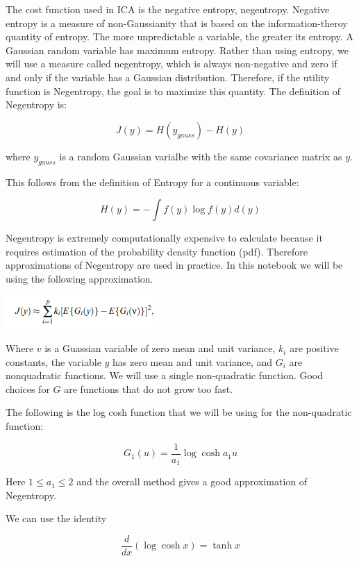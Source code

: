 \documentclass[12pt]{article}
\makeatletter
\def\maxwidth{\ifdim\Gin@nat@width>\linewidth\linewidth
    \else\Gin@nat@width\fi}
\let\Oldincludegraphics\includegraphics
\renewcommand{\includegraphics}[1]{\Oldincludegraphics[width=.8\maxwidth]{#1}}
\makeatother
\begin{document}
The cost function used in ICA is the negative entropy, negentropy.
Negative entropy is a measure of non-Gaussianity that is based on the
information-theroy quantity of entropy. The more unpredictable a
variable, the greater its entropy. A Gaussian random variable has
maximum entropy. Rather than using entropy, we will use a measure called
negentropy, which is always non-negative and zero if and only if the
variable has a Gaussian distribution. Therefore, if the utility function
is Negentropy, the goal is to maximize this quantity. The definition of
Negentropy is:

\[J(y) = H(y_{gauss}) - H(y)\]

where \(y_{gauss}\) is a random Gaussian varialbe with the same
covariance matrix as \(y\).

This follows from the definition of Entropy for a continuous variable:

\[H(y) = -\int{f(y)\log{f(y)}d(y)}\]

Negentropy is extremely computationally expensive to calculate because
it requires estimation of the probability density function (pdf).
Therefore approximations of Negentropy are used in practice. In this
notebook we will be using the following approximation.

\includegraphics{../images/negentropy_approximation.png}

Where \(v\) is a Guassian variable of zero mean and unit variance,
\(k_i\) are positive constants, the variable \(y\) has zero mean and
unit variance, and \(G_i\) are nonquadratic functions. We will use a
single non-quadratic function. Good choices for \(G\) are functions that
do not grow too fast.

The following is the log cosh function that we will be using for the
non-quadratic function:

\[G_1(u) = \frac{1}{a_1}\log{\cosh{a_1u}}\]

Here \(1 \le{a_1}\le{2}\) and the overall method gives a good
approximation of Negentropy.

We can use the identity

\[\frac{d}{dx}(\log{\cosh{x}}) = \tanh{x}\]
\end{document}
